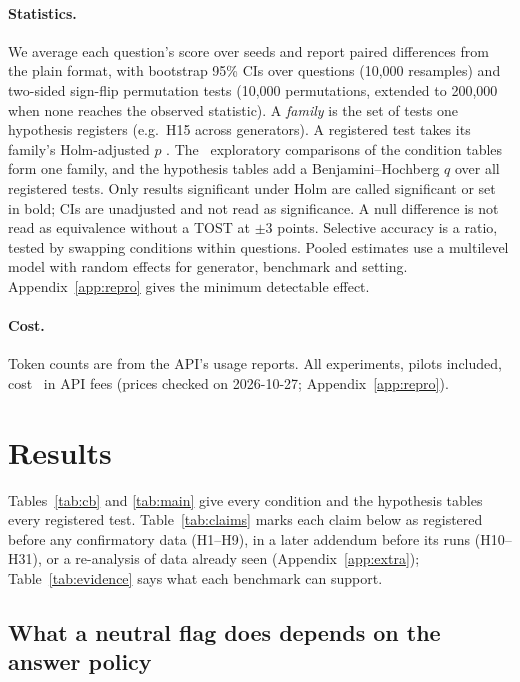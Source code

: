 \paragraph{Statistics.}
We average each question's score over seeds and report paired differences from the plain format, with
bootstrap 95\% CIs over questions (10,000 resamples) and two-sided sign-flip permutation tests
\citep{efron1993bootstrap,dror2018hitchhiker} (10,000 permutations, extended to 200,000 when none reaches the observed
statistic). A \emph{family} is the set of tests one hypothesis registers (e.g.\ H15 across generators). A registered
test takes its family's Holm-adjusted $p$ \citep{holm1979simple}. The \nExploratory\ exploratory comparisons of the
condition tables form one family, and the hypothesis tables add a Benjamini--Hochberg $q$ over all registered tests.
Only results significant under Holm are called significant or set in bold; CIs are unadjusted and not read as
significance. A null difference is not read
as equivalence without a TOST \citep{lakens2017equivalence} at $\pm$3 points. Selective accuracy is a ratio, tested by swapping conditions within questions. Pooled estimates use a multilevel model with random
effects for generator, benchmark and setting. Appendix~\ref{app:repro} gives the minimum detectable effect.

\paragraph{Cost.}
Token counts are from the API's usage reports. All experiments, pilots included, cost \totalSpend\ in API fees
(prices checked on 2026-10-27; Appendix~\ref{app:repro}).
\section{Results}
\label{sec:results}

Tables~\ref{tab:cb} and \ref{tab:main} give every condition and the hypothesis tables every registered test.
Table~\ref{tab:claims} marks each claim below as registered before any confirmatory data (H1--H9), in a later addendum before its
runs (H10--H31), or a re-analysis of data already seen (Appendix~\ref{app:extra});
Table~\ref{tab:evidence} says what each benchmark can support.

\subsection{What a neutral flag does depends on the answer policy}
\label{sec:neutral}


